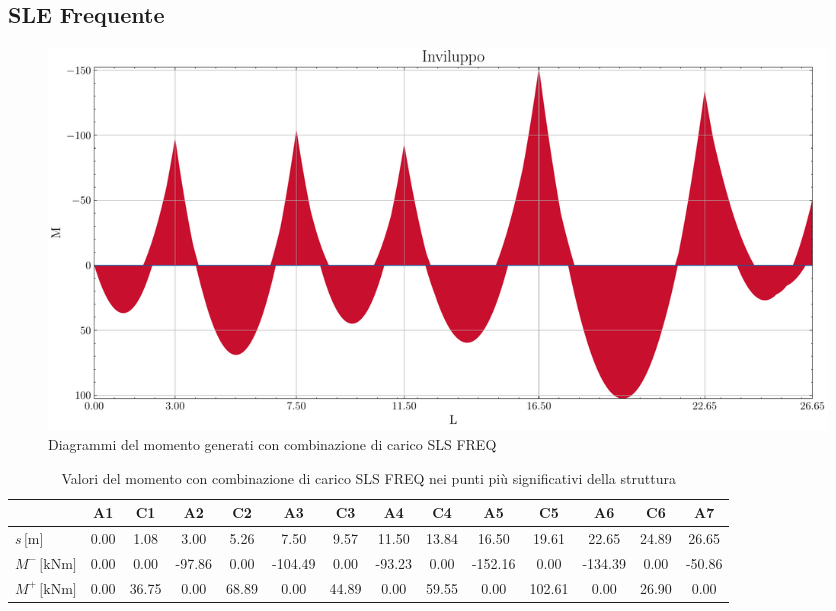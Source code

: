 \begin{landscape}
\subsection{SLE Frequente}
\begin{figure}[H]
\centering
\includegraphics[height=0.6\textwidth]{IMG/diagrammi_trave/SLS_FREQ_M.pdf}
\caption{Diagrammi del momento generati con combinazione di carico SLS FREQ}
\label{fig:trave_SLS_FREQ_momento}
\end{figure}
\begin{table}[H]
\footnotesize
\centering
\caption{Valori del momento con combinazione di carico SLS FREQ nei punti più significativi della struttura}
\label{tab:trave_SLS_FREQ_momento}
	\begin{tabular}{lS[table-format=-3.2]S[table-format=-3.2]S[table-format=-3.2]S[table-format=-3.2]S[table-format=-3.2]S[table-format=-3.2]S[table-format=-3.2]S[table-format=-3.2]S[table-format=-3.2]S[table-format=-3.2]S[table-format=-3.2]S[table-format=-3.2]S[table-format=-3.2]}
		\toprule
		{} & {A1} & {C1} & {A2} & {C2} & {A3} & {C3} & {A4} & {C4} & {A5} & {C5} & {A6} & {C6} & {A7} \\
		\midrule
		$s\,\si{[\metre]}$ & 0.00 & 1.08 & 3.00 & 5.26 & 7.50 & 9.57 & 11.50 & 13.84 & 16.50 & 19.61 & 22.65 & 24.89 & 26.65 \\
        $M^{-}\,\si{[\kilo\newton\metre]}$ & 0.00 & 0.00 & -97.86 & 0.00 & -104.49 & 0.00 & -93.23 & 0.00 & -152.16 & 0.00 & -134.39 & 0.00 & -50.86 \\
        $M^{+}\,\si{[\kilo\newton\metre]}$ & 0.00 & 36.75 & 0.00 & 68.89 & 0.00 & 44.89 & 0.00 & 59.55 & 0.00 & 102.61 & 0.00 & 26.90 & 0.00 \\
		\bottomrule
	\end{tabular}
\end{table}
\clearpage

\end{landscape}
